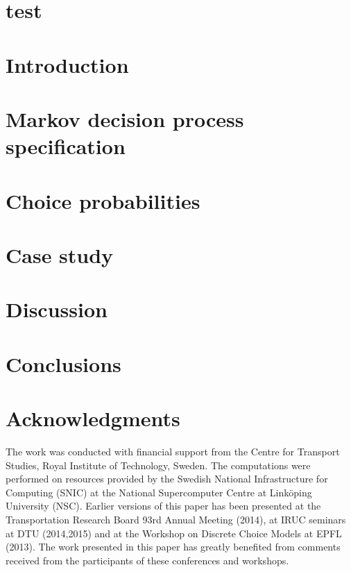 \documentclass[final,pdftex]{Oskarthesis}
\numberwithin{equation}{section}
\begin{document}
\section{test}

\section{Introduction}

\section{Markov decision process specification}\label{seq:model}

\section{Choice probabilities}

\section{Case study}

\FloatBarrier

\section{Discussion}

\section{Conclusions}


\section*{Acknowledgments}
The work was conducted with financial support from the Centre for Transport Studies, Royal Institute of Technology, Sweden. The computations were performed on resources provided by the Swedish National Infrastructure for Computing (SNIC) at the National Supercomputer Centre at Link\"oping University (NSC). Earlier versions of this paper has been presented at the Transportation Research Board 93rd Annual Meeting (2014), at IRUC seminars at DTU (2014,2015) and at the Workshop on Discrete Choice Models at EPFL (2013). The work presented in this paper has greatly benefited from comments received from the participants of these conferences and workshops.

\footnotesize


%

%
\end{document}
